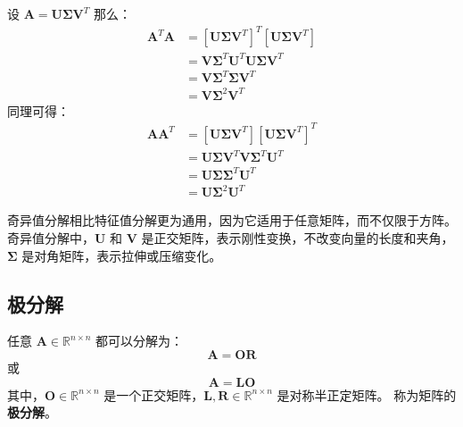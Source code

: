 \begin{corollary}[奇异值分解与特征值分解的关系]
    设 $\mathbf{A} = \mathbf{U} \boldsymbol{\Sigma} \mathbf{V}^T$ 那么：
    \begin{align*}
        \mathbf{A}^T\mathbf{A} &= [\mathbf{U}\mathbf{\Sigma}\mathbf{V}^T]^T[\mathbf{U}\mathbf{\Sigma}\mathbf{V}^T] \\
        &= \mathbf{V}\mathbf{\Sigma}^T\mathbf{U}^T\mathbf{U}\mathbf{\Sigma}\mathbf{V}^T \\
        &= \mathbf{V}\mathbf{\Sigma}^T\mathbf{\Sigma}\mathbf{V}^T \\
        &= \mathbf{V}\mathbf{\Sigma}^2\mathbf{V}^T
    \end{align*}
    同理可得：
    \begin{align*}
        \mathbf{A}\mathbf{A}^T &= [\mathbf{U}\mathbf{\Sigma}\mathbf{V}^T][\mathbf{U}\mathbf{\Sigma}\mathbf{V}^T]^T \\
        &= \mathbf{U}\mathbf{\Sigma}\mathbf{V}^T\mathbf{V}\mathbf{\Sigma}^T\mathbf{U}^T \\
        &= \mathbf{U}\mathbf{\Sigma}\mathbf{\Sigma}^T\mathbf{U}^T \\
        &= \mathbf{U}\mathbf{\Sigma}^2\mathbf{U}^T
    \end{align*}
\end{corollary}

\begin{note}
    奇异值分解相比特征值分解更为通用，因为它适用于任意矩阵，而不仅限于方阵。
    奇异值分解中，$\mathbf{U}$ 和 $\mathbf{V}$ 是正交矩阵，表示刚性变换，不改变向量的长度和夹角，
    $\boldsymbol{\Sigma}$ 是对角矩阵，表示拉伸或压缩变化。
\end{note}

\vspace{1em}
\subsection{极分解}

\begin{proposition}
    任意 $\mathbf{A} \in \mathbb{R}^{n \times n}$ 都可以分解为：
    \[
        \mathbf{A} = \mathbf{O} \mathbf{R}
    \]
    或
    \[
        \mathbf{A} = \mathbf{L} \mathbf{O}
    \]
    其中，$\mathbf{O} \in \mathbb{R}^{n \times n}$ 是一个正交矩阵，$\mathbf{L}, \mathbf{R} \in \mathbb{R}^{n \times n}$ 是对称半正定矩阵。
    称为矩阵的\textbf{极分解}。
    \label{proposition:polar_decomposition}
\end{proposition}

